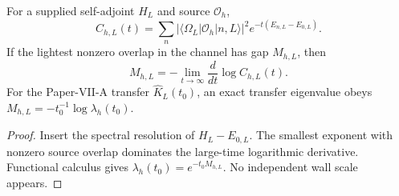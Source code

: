 \documentclass[12pt,a4paper]{article}
\begin{document}
\begin{theorem}
\label{p11:thm:native-spectral-correlator-mass-bridge}

For a supplied self-adjoint \(H_L\) and source \(\mathcal O_h\),
\[
C_{h,L}(t)=\sum_n |\langle\Omega_L|\mathcal O_h|n,L\rangle|^2e^{-t(E_{n,L}-E_{0,L})}.
\]
If the lightest nonzero overlap in the channel has gap \(M_{h,L}\), then
\[
M_{h,L}=-\lim_{t\to\infty}\frac{d}{dt}\log C_{h,L}(t).
\]
For the Paper-VII-A transfer \(\widehat K_L(t_0)\), an exact transfer eigenvalue obeys \(M_{h,L}=-t_0^{-1}\log\lambda_h(t_0)\).
\label{p11:eq:spectral-correlator-decomposition}
\label{p11:eq:mass-from-correlator}
\label{p11:eq:mass-from-transfer-eigenvalue}
\end{theorem}
\begin{proof}

Insert the spectral resolution of \(H_L-E_{0,L}\).  The smallest exponent with nonzero source overlap dominates the large-time logarithmic derivative.  Functional calculus gives \(\lambda_h(t_0)=e^{-t_0M_{h,L}}\).  No independent wall scale appears.
\end{proof}
\end{document}
